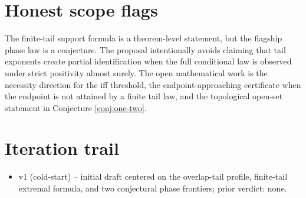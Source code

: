 \documentclass[11pt]{article}
\theoremstyle{definition}
\theoremstyle{plain}
\theoremstyle{remark}
\begin{document}
\section{Honest scope flags}
The finite-tail support formula is a theorem-level statement, but the flagship phase law is a conjecture.  The proposal intentionally avoids claiming that tail exponents create partial identification when the full conditional law is observed under strict positivity almost surely.  The open mathematical work is the necessity direction for the iff threshold, the endpoint-approaching certificate when the endpoint is not attained by a finite tail law, and the topological open-set statement in Conjecture \ref{conj:one-two}.

\section{Iteration trail}
\begin{itemize}[leftmargin=*]
\item v1 (cold-start) -- initial draft centered on the overlap-tail profile, finite-tail extremal formula, and two conjectural phase frontiers; prior verdict: none.
\end{itemize}
\end{document}
